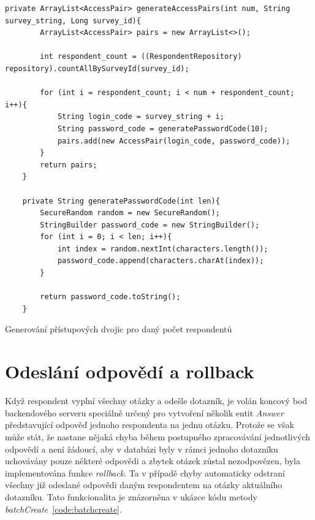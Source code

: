 \begin{listing}[h!]
    \begin{verbatim}
private ArrayList<AccessPair> generateAccessPairs(int num, String survey_string, Long survey_id){
        ArrayList<AccessPair> pairs = new ArrayList<>();

        int respondent_count = ((RespondentRepository) repository).countAllBySurveyId(survey_id);

        for (int i = respondent_count; i < num + respondent_count; i++){
            String login_code = survey_string + i;
            String password_code = generatePasswordCode(10);
            pairs.add(new AccessPair(login_code, password_code));
        }
        return pairs;
    }

    private String generatePasswordCode(int len){
        SecureRandom random = new SecureRandom();
        StringBuilder password_code = new StringBuilder();
        for (int i = 0; i < len; i++){
            int index = random.nextInt(characters.length());
            password_code.append(characters.charAt(index));
        }

        return password_code.toString();
    }

    \end{verbatim}
\caption{Generování přístupových dvojic pro daný počet respondentů}
\label{code:respondents}
\end{listing}

\section{Odeslání odpovědí a rollback}
Když respondent vyplní všechny otázky a odešle dotazník, je volán koncový bod backendového serveru speciálně
určený pro vytvoření několik entit \textit{Answer} představující odpověď jednoho respondenta na jednu otázku.
Protože se však může stát, že nastane nějaká chyba během postupného zpracovávání jednotlivých odpovědí a není
žádoucí, aby v databázi byly v rámci jednoho dotazníku uchovávány pouze některé odpovědi a zbytek otázek zůstal
nezodpovězen, byla implementována funkce \textit{rollback}. Ta v případě chyby automaticky odstraní všechny již odeslané
odpovědi daným respondentem na otázky aktuálního dotazníku. Tato funkcionalita je znázorněna v ukázce kódu 
metody \textit{batchCreate}~\ref{code:batchcreate}.

